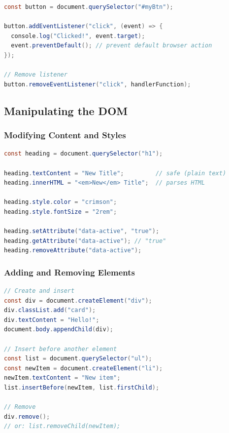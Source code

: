 \documentclass[hidelinks]{article}
\begin{document}
\begin{lstlisting}[language=Java, caption={Event handling example}]
const button = document.querySelector("#myBtn");

button.addEventListener("click", (event) => {
  console.log("Clicked!", event.target);
  event.preventDefault(); // prevent default browser action
});

// Remove listener
button.removeEventListener("click", handlerFunction);
\end{lstlisting}

\subsection{Manipulating the DOM}

\subsubsection{Modifying Content and Styles}
\begin{lstlisting}[language=Java, caption={Changing content and styles}]
const heading = document.querySelector("h1");

heading.textContent = "New Title";         // safe (plain text)
heading.innerHTML = "<em>New</em> Title";  // parses HTML

heading.style.color = "crimson";
heading.style.fontSize = "2rem";

heading.setAttribute("data-active", "true");
heading.getAttribute("data-active"); // "true"
heading.removeAttribute("data-active");
\end{lstlisting}

\subsubsection{Adding and Removing Elements}
\begin{lstlisting}[language=Java, caption={Creating and removing DOM nodes}]
// Create and insert
const div = document.createElement("div");
div.classList.add("card");
div.textContent = "Hello!";
document.body.appendChild(div);

// Insert before another element
const list = document.querySelector("ul");
const newItem = document.createElement("li");
newItem.textContent = "New item";
list.insertBefore(newItem, list.firstChild);

// Remove
div.remove();
// or: list.removeChild(newItem);
\end{lstlisting}
\end{document}
